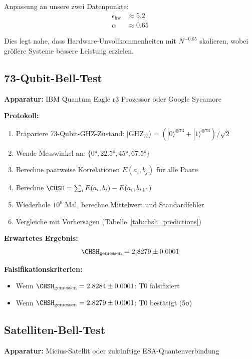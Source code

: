 Anpassung an unsere zwei Datenpunkte:
\begin{align}
	\epsilon_{\text{hw}} &\approx 5.2 \\
	\alpha &\approx 0.65
\end{align}

Dies legt nahe, dass Hardware-Unvollkommenheiten mit $N^{-0.65}$ skalieren, wobei größere Systeme bessere Leistung erzielen.

\subsection{73-Qubit-Bell-Test}

\textbf{Apparatur:} IBM Quantum Eagle r3 Prozessor oder Google Sycamore

\textbf{Protokoll:}
\begin{enumerate}
	\item Präpariere 73-Qubit-GHZ-Zustand: $|\text{GHZ}_{73}\rangle = (|0\rangle^{\otimes 73} + |1\rangle^{\otimes 73})/\sqrt{2}$
	\item Wende Messwinkel an: $\{0°, 22.5°, 45°, 67.5°\}$
	\item Berechne paarweise Korrelationen $E(a_i, b_j)$ für alle Paare
	\item Berechne $\CHSH = \sum_i E(a_i, b_i) - E(a_i, b_{i+1})$
	\item Wiederhole $10^6$ Mal, berechne Mittelwert und Standardfehler
	\item Vergleiche mit Vorhersagen (Tabelle~\ref{tab:chsh_predictions})
\end{enumerate}

\textbf{Erwartetes Ergebnis:}
\begin{equation}
	\CHSH_{\text{gemessen}} = 2.8279 \pm 0.0001
\end{equation}

\textbf{Falsifikationskriterien:}
\begin{itemize}
	\item Wenn $\CHSH_{\text{gemessen}} = 2.8284 \pm 0.0001$: T0 falsifiziert
	\item Wenn $\CHSH_{\text{gemessen}} = 2.8279 \pm 0.0001$: T0 bestätigt (5σ)
\end{itemize}

\subsection{Satelliten-Bell-Test}

\textbf{Apparatur:} Micius-Satellit oder zukünftige ESA-Quantenverbindung

